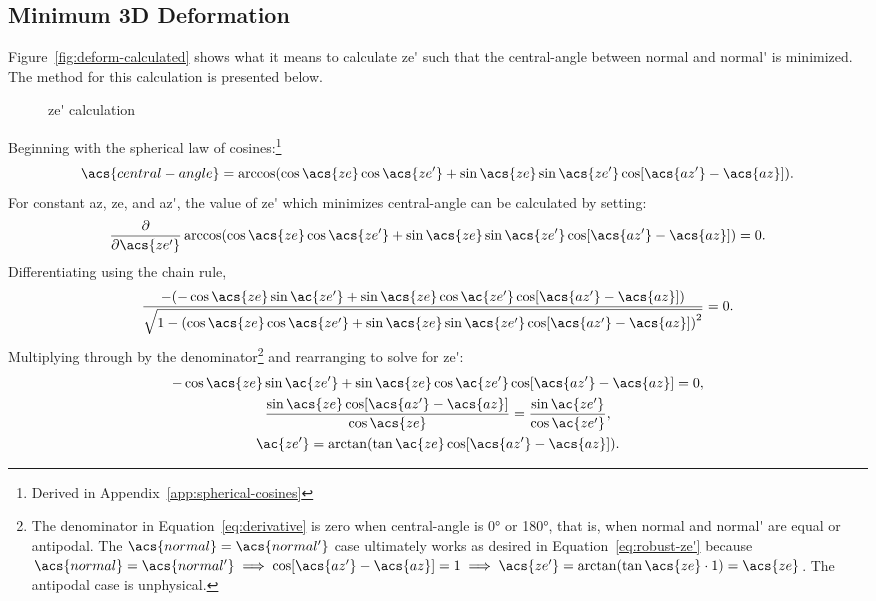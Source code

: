 \subsection{Minimum 3D Deformation}\label{sec:3d-deform}
Figure~\ref{fig:deform-calculated} shows what it means to calculate \acs{ze'} such that the \acf{central-angle} between \acs{normal} and \acs{normal'} is minimized. The method for this calculation is presented below.
\begin{figure}
    \centering
    
    \caption{\Acl{ze'} calculation}\label{fig:deform}
\end{figure}
Beginning with the spherical law of cosines:\footnote{Derived in Appendix~\ref{app:spherical-cosines}}
\begin{equation}
    \acs{central-angle}
    =\arccos(\cos\acs{ze}\cos\acs{ze'}
    +\sin\acs{ze}\sin\acs{ze'}
    \cos[\acs{az'}-\acs{az}]).
    \label{eq:central-angle}
\end{equation}
For constant \acs{az}, \acs{ze}, and \acs{az'}, the value of \acs{ze'} which minimizes \acs{central-angle} can be calculated by setting:
\begin{equation}
    \frac{\partial}{\partial \acs{ze'}}
    \arccos(\cos\acs{ze}\cos\acs{ze'}
    +\sin\acs{ze}\sin\acs{ze'}
    \cos[\acs{az'}-\acs{az}])
    =0.\label{eq:mimimum}
\end{equation}
Differentiating using the chain rule,
\begin{equation}
    \frac{-(-\cos\acs{ze}\sin\ac{ze'}
    +\sin\acs{ze}\cos\ac{ze'}
    \cos[\acs{az'}-\acs{az}])}
    {\sqrt{1-{(\cos\acs{ze}\cos\acs{ze'}
    +\sin\acs{ze}\sin\acs{ze'}
    \cos[\acs{az'}-\acs{az}])}^2}}
    =0.\label{eq:derivative}
\end{equation}
Multiplying through by the denominator\footnote{The denominator in Equation~\eqref{eq:derivative} is zero when \acs{central-angle} is \ang{0} or \ang{180}, that is, when \acs{normal} and \acs{normal'} are equal or antipodal. The $\acs{normal}=\acs{normal'}$ case ultimately works as desired in Equation~\eqref{eq:robust-ze'} because $\acs{normal}=\acs{normal'}\implies\cos[\acs{az'}-\acs{az}]=1\implies\acs{ze'}=\arctan(\tan\acs{ze}\cdot1)=\acs{ze}$. The antipodal case is unphysical.} and rearranging to solve for \acs{ze'}:
\begin{gather}
    -\cos\acs{ze}\sin\ac{ze'}
    +\sin\acs{ze}\cos\ac{ze'}
    \cos[\acs{az'}-\acs{az}]
    =0,\nonumber\\
    \frac{\sin\acs{ze}
    \cos[\acs{az'}-\acs{az}]}
    {\cos\acs{ze}}
    =\frac{\sin\ac{ze'}}{\cos\ac{ze'}},\nonumber\\
    \ac{ze'}
    =\arctan(\tan\ac{ze}
    \cos[\acs{az'}-\acs{az}]).
    \label{eq:ze'}
\end{gather}
